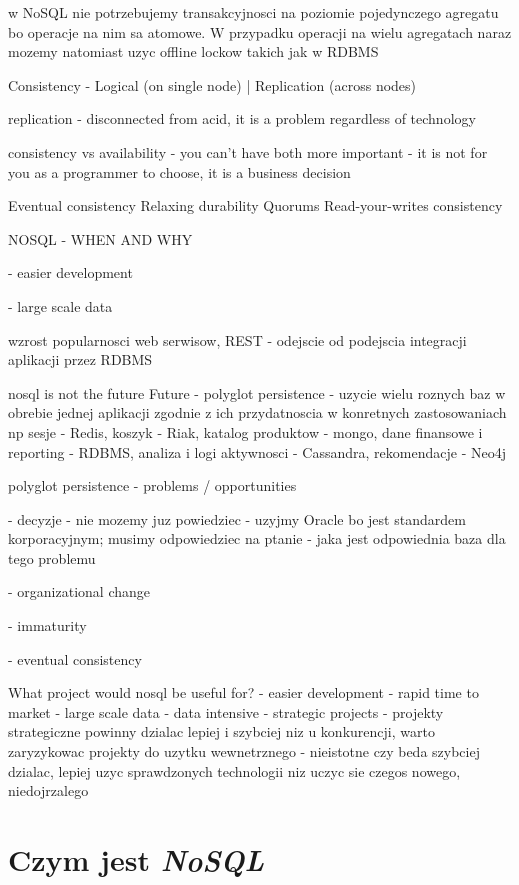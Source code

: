 w NoSQL nie potrzebujemy transakcyjnosci na poziomie pojedynczego agregatu bo operacje na nim sa atomowe. W przypadku operacji na wielu agregatach naraz mozemy natomiast uzyc offline lockow takich jak w RDBMS


Consistency - Logical (on single node)  |   Replication (across nodes)

replication - disconnected from acid, it is a problem regardless of technology

consistency vs availability - you can't have both
more important - it is not for you as a programmer to choose, it is a business decision

Eventual consistency
Relaxing durability
Quorums
Read-your-writes consistency


NOSQL - WHEN AND WHY

- easier development

- large scale data



wzrost popularnosci web serwisow, REST - odejscie od podejscia integracji aplikacji przez RDBMS


nosql is not the future
Future - polyglot persistence - uzycie wielu roznych baz w obrebie jednej aplikacji zgodnie z ich przydatnoscia w konretnych zastosowaniach np sesje - Redis, koszyk - Riak, katalog produktow - mongo, dane finansowe i reporting - RDBMS, analiza i logi aktywnosci - Cassandra, rekomendacje - Neo4j


polyglot persistence - problems / opportunities

 - decyzje - nie mozemy juz powiedziec - uzyjmy Oracle bo jest standardem korporacyjnym; musimy odpowiedziec na ptanie - jaka jest odpowiednia baza dla tego problemu

- organizational change

 - immaturity

- eventual consistency




What project would nosql be useful for?
- easier development - rapid time to market
- large scale data - data intensive
- strategic projects - projekty strategiczne powinny dzialac lepiej i szybciej niz u konkurencji, warto zaryzykowac
projekty do uzytku wewnetrznego - nieistotne czy beda szybciej dzialac, lepiej uzyc sprawdzonych technologii niz uczyc sie czegos nowego, niedojrzalego


\section{Czym jest \emph{NoSQL}}
\label{sec:czymJestNoSQL}

